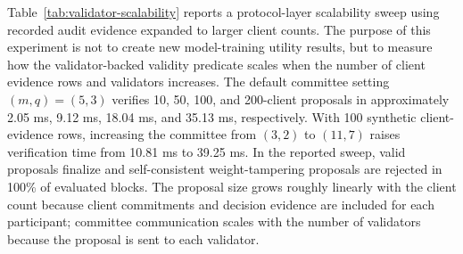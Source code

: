 \documentclass[preprint,12pt]{elsarticle}
\begin{document}
Table~\ref{tab:validator-scalability} reports a protocol-layer scalability sweep using recorded audit evidence expanded to larger client counts. The purpose of this experiment is not to create new model-training utility results, but to measure how the validator-backed validity predicate scales when the number of client evidence rows and validators increases. The default committee setting $(m,q)=(5,3)$ verifies 10, 50, 100, and 200-client proposals in approximately 2.05 ms, 9.12 ms, 18.04 ms, and 35.13 ms, respectively. With 100 synthetic client-evidence rows, increasing the committee from $(3,2)$ to $(11,7)$ raises verification time from 10.81 ms to 39.25 ms. In the reported sweep, valid proposals finalize and self-consistent weight-tampering proposals are rejected in 100\% of evaluated blocks. The proposal size grows roughly linearly with the client count because client commitments and decision evidence are included for each participant; committee communication scales with the number of validators because the proposal is sent to each validator.

\begin{table}[t]
\centering
\caption{Protocol-layer scalability of validator-backed audit verification. Client counts are obtained by deterministic expansion of recorded audit evidence; rejection is measured against self-consistent weight tampering.}
\label{tab:validator-scalability}
\end{table}
\end{document}

